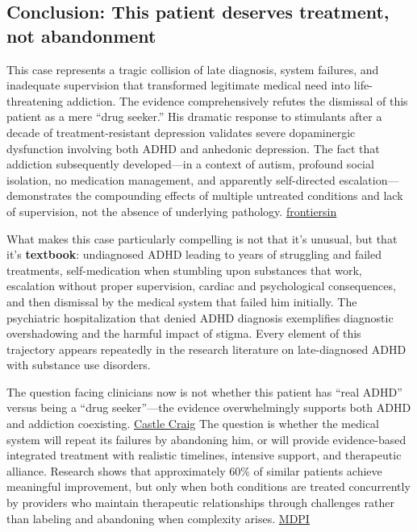 \subsection{Conclusion: This patient deserves treatment, not abandonment}\label{10c_self_medication-conclusion-this-patient-deserves-treatment-not-abandonment}

This case represents a tragic collision of late diagnosis, system failures, and inadequate supervision that transformed legitimate medical need into life-threatening addiction. The evidence comprehensively refutes the dismissal of this patient as a mere ``drug seeker.'' His dramatic response to stimulants after a decade of treatment-resistant depression validates severe dopaminergic dysfunction involving both ADHD and anhedonic depression. The fact that addiction subsequently developed---in a context of autism, profound social isolation, no medication management, and apparently self-directed escalation---demonstrates the compounding effects of multiple untreated conditions and lack of supervision, not the absence of underlying pathology. \href{https://www.frontiersin.org/journals/psychiatry/articles/10.3389/fpsyt.2019.00311/full}{frontiersin}

What makes this case particularly compelling is not that it's unusual, but that it's \textbf{textbook}: undiagnosed ADHD leading to years of struggling and failed treatments, self-medication when stumbling upon substances that work, escalation without proper supervision, cardiac and psychological consequences, and then dismissal by the medical system that failed him initially. The psychiatric hospitalization that denied ADHD diagnosis exemplifies diagnostic overshadowing and the harmful impact of stigma. Every element of this trajectory appears repeatedly in the research literature on late-diagnosed ADHD with substance use disorders.

The question facing clinicians now is not whether this patient has ``real ADHD'' versus being a ``drug seeker''---the evidence overwhelmingly supports both ADHD and addiction coexisting. \href{https://www.castlecraig.co.uk/dual-diagnosis/adhd/}{Castle Craig} The question is whether the medical system will repeat its failures by abandoning him, or will provide evidence-based integrated treatment with realistic timelines, intensive support, and therapeutic alliance. Research shows that approximately 60\% of similar patients achieve meaningful improvement, but only when both conditions are treated concurrently by providers who maintain therapeutic relationships through challenges rather than labeling and abandoning when complexity arises. \href{https://www.mdpi.com/2077-0383/12/9/3096}{MDPI}

